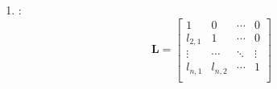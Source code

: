 \begin{itemize}
\begin{enumerate}
		\item {}:
		\begin{equation*}
			\mathbf{L} = \begin{bmatrix}
				1 & 0 & \cdots & 0 \\
				l_{2,1} & 1 & \cdots & 0 \\
				\vdots & \cdots & \ddots & \vdots \\
				l_{n,1} & l_{n,2} & \cdots & 1 \\
			\end{bmatrix}
		\end{equation*}
	\end{enumerate}
\end{itemize}